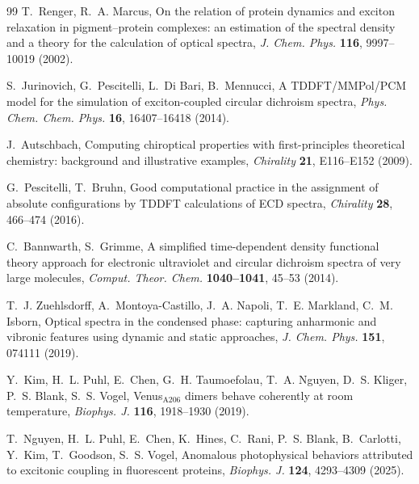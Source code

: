 \documentclass[11pt,a4paper]{article}
\begin{document}
\begin{thebibliography}{99}
T.~Renger, R.~A. Marcus,
On the relation of protein dynamics and exciton relaxation in
pigment--protein complexes: an estimation of the spectral density and a
theory for the calculation of optical spectra,
\emph{J. Chem. Phys.} \textbf{116}, 9997--10019 (2002).

S.~Jurinovich, G.~Pescitelli, L.~Di Bari, B.~Mennucci,
A TDDFT/MMPol/PCM model for the simulation of exciton-coupled circular
dichroism spectra,
\emph{Phys. Chem. Chem. Phys.} \textbf{16}, 16407--16418 (2014).

J.~Autschbach,
Computing chiroptical properties with first-principles theoretical
chemistry: background and illustrative examples,
\emph{Chirality} \textbf{21}, E116--E152 (2009).

G.~Pescitelli, T.~Bruhn,
Good computational practice in the assignment of absolute configurations by
TDDFT calculations of ECD spectra,
\emph{Chirality} \textbf{28}, 466--474 (2016).

C.~Bannwarth, S.~Grimme,
A simplified time-dependent density functional theory approach for
electronic ultraviolet and circular dichroism spectra of very large
molecules,
\emph{Comput. Theor. Chem.} \textbf{1040--1041}, 45--53 (2014).

T.~J. Zuehlsdorff, A.~Montoya-Castillo, J.~A. Napoli, T.~E. Markland,
C.~M. Isborn,
Optical spectra in the condensed phase: capturing anharmonic and vibronic
features using dynamic and static approaches,
\emph{J. Chem. Phys.} \textbf{151}, 074111 (2019).

Y.~Kim, H.~L. Puhl, E.~Chen, G.~H. Taumoefolau, T.~A. Nguyen, D.~S. Kliger,
P.~S. Blank, S.~S. Vogel,
Venus$_{\mathrm{A206}}$ dimers behave coherently at room temperature,
\emph{Biophys. J.} \textbf{116}, 1918--1930 (2019).

T.~Nguyen, H.~L. Puhl, E.~Chen, K.~Hines, C.~Rani, P.~S. Blank, B.~Carlotti,
Y.~Kim, T.~Goodson, S.~S. Vogel,
Anomalous photophysical behaviors attributed to excitonic coupling in
fluorescent proteins,
\emph{Biophys. J.} \textbf{124}, 4293--4309 (2025).

\end{thebibliography}
\end{document}
